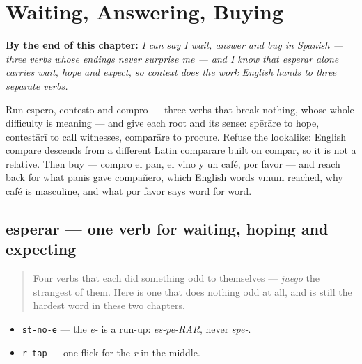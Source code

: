 
\chapter{Waiting, Answering, Buying}
\label{ch:spanish-wait-answer-buy}

\begin{chapteropening}
\textbf{By the end of this chapter:} \emph{I can say I wait, answer and buy in Spanish — three verbs whose endings never surprise me — and I know that esperar alone carries wait, hope and expect, so context does the work English hands to three separate verbs.}

Run espero, contesto and compro — three verbs that break nothing, whose whole difficulty is meaning — and give each root and its sense: spērāre to hope, contestārī to call witnesses, comparāre to procure. Refuse the lookalike: English compare descends from a different Latin comparāre built on compār, so it is not a relative. Then buy — compro el pan, el vino y un café, por favor — and reach back for what pānis gave compañero, which English words vīnum reached, why café is masculine, and what por favor says word for word.
\end{chapteropening}

\section[esperar]{esperar — one verb for waiting, hoping and expecting}

\label{lesson:ES-C40-esperar}



\begin{quote}
Four verbs that each did something odd to themselves — \emph{juego} the strangest of them. Here is one that does nothing odd at all, and is still the hardest word in these two chapters.
\end{quote}

\begin{sounds}
\begin{itemize}
\raggedright
  \item \texttt{st-no-e} — the \emph{e-} is a run-up: \emph{es-pe-RAR}, never \emph{spe-}.
  \item \texttt{r-tap} — one flick for the \emph{r} in the middle.
\end{itemize}
\end{sounds}

